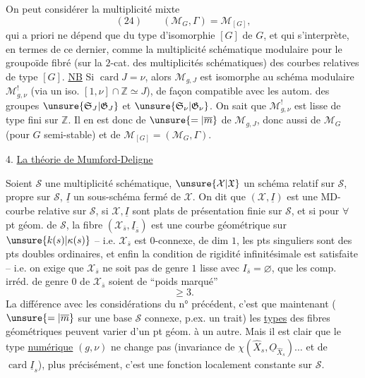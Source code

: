 On peut considérer la multiplicité mixte
\[
(24)\qquad(\mathcal M_G,\Gamma)=\mathcal M_{[G]},
\]
qui a priori ne dépend que du type d'isomorphie $[G]$ de $G$, et qui s'interprète, en termes de ce dernier, comme la multiplicité schématique modulaire pour le groupoïde fibré (sur la $2$-cat. des multiplicités schématiques) des courbes  relatives de type $[G]$.
\uline{NB} Si $\operatorname{card}J=\nu$, alors $\mathcal M_{g,J}$ est isomorphe au schéma modulaire $\mathcal M^!_{g,\nu}$ (via un iso. $[1,\nu]\cap\mathbb Z\simeq J$), de façon compatible avec les autom. des groupes $\unsure{\mathfrak S_J|\mathfrak G_J}$ et $\unsure{\mathfrak S_\nu|\mathfrak G_\nu}$. On sait que $\mathcal M^!_{g,\nu}$ est lisse de type fini sur $\mathbb Z$. Il en est donc de $\unsure{=|\overline m}$ de $\mathcal M_{g,J}$, donc aussi de $\mathcal M_G$ (pour $G$ semi-stable) et de $\mathcal M_{[G]}=(\mathcal M_G,\Gamma)$.

4. \uline{La théorie de Mumford-Deligne}

Soient $\mathcal S$ une multiplicité schématique, $\unsure{\mathcal X|\mathfrak X}$ un  schéma relatif sur $\mathcal S$, propre sur $\mathcal S$, $\underline I$ un sous-schéma fermé de $\mathcal X$. On dit que $(\mathcal X,\underline I)$ est une MD-courbe relative sur $\mathcal S$, si $\mathcal X,\underline I$ sont plats de présentation finie sur $\mathcal S$, et si pour $\forall$ pt géom. de $\mathcal S$, la
fibre $(\mathcal X_{\bar s},\underline I_{\bar s})$ est une courbe géométrique sur $\unsure{k(s)|\kappa(s)}$ -- i.e. $\mathcal X_{\bar s}$ est $0$-connexe, de dim $1$,  les pts singuliers sont  des pts doubles ordinaires, et enfin la condition de rigidité infinitésimale  est satisfaite --  i.e. on exige que $\mathcal X_{\bar s}$ ne soit pas de genre $1$ lisse avec $I_{\bar s}=\varnothing$,  que les comp. irréd. de genre $0$ de $\mathcal X_{\bar s}$ soient de ``poids marqué''
\[
\geq 3.
\]
La différence avec les considérations du n° précédent, c'est que maintenant ($\unsure{=|\overline m}$ sur une base $\mathcal S$ connexe, p.ex.  un trait) les \uline{types} des fibres géométriques peuvent varier d'un pt géom. à un autre. Mais il est clair que le type \uline{numérique} $(g,\nu)$ ne change pas (invariance de $\chi(\widehat X_s,\underline O_{\widehat X_s})\ldots$ et de $\operatorname{card}\underline I_s$), plus précisément,
c'est une fonction localement constante sur $\mathcal S$.

